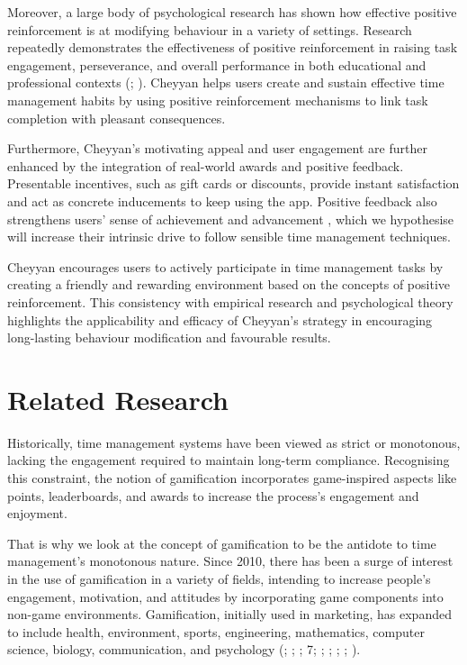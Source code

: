\documentclass{l4proj}
\begin{document}
Moreover, a large body of psychological research has shown how effective positive reinforcement is at modifying behaviour in a variety of settings. Research repeatedly demonstrates the effectiveness of positive reinforcement in raising task engagement, perseverance, and overall performance in both educational and professional contexts (\cite{cameron1994reinforcement}; \cite{deci1999meta}). Cheyyan helps users create and sustain effective time management habits by using positive reinforcement mechanisms to link task completion with pleasant consequences.

Furthermore, Cheyyan's motivating appeal and user engagement are further enhanced by the integration of real-world awards and positive feedback. Presentable incentives, such as gift cards or discounts, provide instant satisfaction and act as concrete inducements to keep using the app. Positive feedback also strengthens users' sense of achievement and advancement \cite{peterson2006impact}, which we hypothesise will increase their intrinsic drive to follow sensible time management techniques.

Cheyyan encourages users to actively participate in time management tasks by creating a friendly and rewarding environment based on the concepts of positive reinforcement. This consistency with empirical research and psychological theory highlights the applicability and efficacy of Cheyyan's strategy in encouraging long-lasting behaviour modification and favourable results.


\section{Related Research}

Historically, time management systems have been viewed as strict or monotonous, lacking the engagement required to maintain long-term compliance. Recognising this constraint, the notion of gamification incorporates game-inspired aspects like points, leaderboards, and awards to increase the process's engagement and enjoyment.

That is why we look at the concept of gamification to be the antidote to time management's monotonous nature. Since 2010, there has been a surge of interest in the use of gamification in a variety of fields, intending to increase people's engagement, motivation, and attitudes by incorporating game components into non-game environments. Gamification, initially used in marketing, has expanded to include health, environment, sports, engineering, mathematics, computer science, biology, communication, and psychology (\cite{schoech2013gamification}; \cite{filsecker2014multilevel}; \cite{hamari2015working}; \cite{huotari2017definition}7; \cite{attali2015gamification}; \cite{dominguez2013gamifying}; \cite{su2015mobile}; \cite{hanus2015assessing}; \cite{landers2014empirical}).
\end{document}
